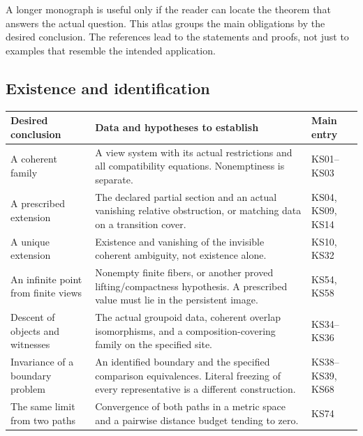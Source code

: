 \clearpage
{}\label{app:hypotheses}
A longer monograph is useful only if the reader can locate the theorem that answers the actual question. This atlas groups the main obligations by the desired conclusion. The references lead to the statements and proofs, not just to examples that resemble the intended application.

\subsection{Existence and identification}
\begin{longtable}{@{}p{.24\linewidth}p{.48\linewidth}p{.21\linewidth}@{}}
\toprule Desired conclusion & Data and hypotheses to establish & Main entry\\\midrule\endhead
A coherent family & A view system with its actual restrictions and all compatibility equations. Nonemptiness is separate. & KS01--KS03\\[4pt]
A prescribed extension & The declared partial section and an actual vanishing relative obstruction, or matching data on a transition cover. & KS04, KS09, KS14\\[4pt]
A unique extension & Existence and vanishing of the invisible coherent ambiguity, not existence alone. & KS10, KS32\\[4pt]
An infinite point from finite views & Nonempty finite fibers, or another proved lifting/compactness hypothesis. A prescribed value must lie in the persistent image. & KS54, KS58\\[4pt]
Descent of objects and witnesses & The actual groupoid data, coherent overlap isomorphisms, and a composition-covering family on the specified site. & KS34--KS36\\[4pt]
Invariance of a boundary problem & An identified boundary and the specified comparison equivalences. Literal freezing of every representative is a different construction. & KS38--KS39, KS68\\[4pt]
The same limit from two paths & Convergence of both paths in a metric space and a pairwise distance budget tending to zero. & KS74\\
\bottomrule
\end{longtable}

